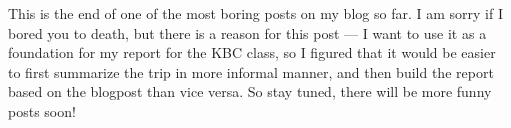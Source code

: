 \begin{post}
\begin{content}

This is the end of one of the most boring posts on my blog so far. I am sorry if I bored you to death, but there is a reason for this post --- I want to use it as a foundation for my report for the KBC class, so I figured that it would be easier to first summarize the trip in more informal manner, and then build the report based on the blogpost than vice versa. So stay tuned, there will be more funny posts soon!
	\end{content}
\end{post}
